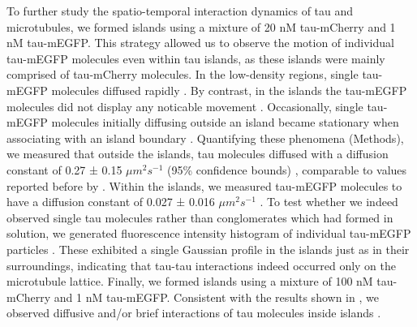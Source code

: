 To further study the spatio-temporal interaction dynamics of tau and microtubules, we formed islands using a mixture of 20 nM tau-mCherry and 1 nM tau-mEGFP. This strategy allowed us to observe the motion of individual tau-mEGFP molecules even within tau islands, as these islands were mainly comprised of tau-mCherry molecules. In the low-density regions, single tau-mEGFP molecules diffused rapidly . By contrast, in the islands the tau-mEGFP molecules did not display any noticable movement . Occasionally, single tau-mEGFP molecules initially diffusing outside an island became stationary when associating with an island boundary . Quantifying these phenomena (Methods), we measured that outside the islands, tau molecules diffused with a diffusion constant of 0.27 ± 0.15 $\mu m^2s^{-1}$ (95\% confidence bounds) , comparable to values reported before by \cite{Hinrichs2012b}. Within the islands, we measured tau-mEGFP molecules to have a diffusion constant of 0.027 ± 0.016 $\mu m^2s^{-1}$ . To test whether we indeed observed single tau molecules rather than conglomerates which had formed in solution, we generated fluorescence intensity histogram of individual tau-mEGFP particles . These exhibited a single Gaussian profile in the islands just as in their surroundings, indicating that tau-tau interactions indeed occurred only on the microtubule lattice. Finally, we formed islands using a mixture of 100 nM tau-mCherry and 1 nM tau-mEGFP. Consistent with the results shown in , we observed diffusive and/or brief interactions of tau molecules inside islands .\par

